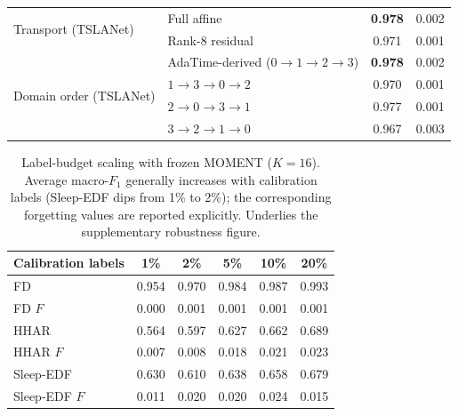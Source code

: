 \begin{table}[t]
\begin{tabular}{ll cc}
\cmidrule(lr){1-4}
\multirow{2}{*}{Transport (TSLANet)}
 & Full affine & \textbf{0.978} & 0.002\\
 & Rank-8 residual & 0.971 & 0.001\\
\cmidrule(lr){1-4}
\multirow{4}{*}{Domain order (TSLANet)}
 & AdaTime-derived ($0{\to}1{\to}2{\to}3$) & \textbf{0.978} & 0.002\\
 & $1{\to}3{\to}0{\to}2$ & 0.970 & 0.001\\
 & $2{\to}0{\to}3{\to}1$ & 0.977 & 0.001\\
 & $3{\to}2{\to}1{\to}0$ & 0.967 & 0.003\\
\bottomrule
\end{tabular}
\end{table}

\begin{table}[t]
\centering
\caption{Label-budget scaling with frozen MOMENT ($K{=}16$). Average macro-$F_1$
generally increases with calibration labels (Sleep-EDF dips from 1\% to 2\%);
the corresponding forgetting values are reported explicitly.
Underlies the supplementary robustness figure.}
\label{tab:budget-moment}
\small
\begin{tabular}{l ccccc}
\toprule
Calibration labels & 1\% & 2\% & 5\% & 10\% & 20\%\\
\midrule
FD & 0.954 & 0.970 & 0.984 & 0.987 & 0.993\\
FD $F$ & 0.000 & 0.001 & 0.001 & 0.001 & 0.001\\
HHAR & 0.564 & 0.597 & 0.627 & 0.662 & 0.689\\
HHAR $F$ & 0.007 & 0.008 & 0.018 & 0.021 & 0.023\\
Sleep-EDF & 0.630 & 0.610 & 0.638 & 0.658 & 0.679\\
Sleep-EDF $F$ & 0.011 & 0.020 & 0.020 & 0.024 & 0.015\\
\bottomrule
\end{tabular}
\end{table}
